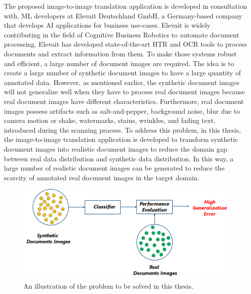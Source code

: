 The proposed image-to-image translation application is developed in consultation with, \ac{ML} developers at Elevait Deutschland GmbH, a Germany-based company that develops \ac{AI} applications for business use-cases. Elevait is widely contributing in the field of Cognitive Business Robotics\cite{Metta2012} to automate document processing. Elevait has developed state-of-the-art \ac{HTR} and \ac{OCR} tools to process documents and extract information from them. To make those systems robust and efficient, a large number of document images are required. The idea is to create a large number of synthetic document images to have a large quantity of annotated data. However, as mentioned earlier, the synthetic document images will not generalize well when they have to process real document images because real document images have different characteristics. Furthermore, real document images possess artifacts such as salt-and-pepper, background noise, blur due to camera motion or shake, watermarks, stains, wrinkles, and fading text, introduced during the scanning process\cite{sharma2019learning}. To address this problem, in this thesis, the image-to-image translation application is developed to transform synthetic document images into realistic document images to reduce the domain gap between real data distribution and synthetic data distribution. In this way, a large number of realistic document images can be generated to reduce the scarcity of annotated real document images in the target domain.




\begin{figure}[H]
        \begin{center}
	    \includegraphics[scale=0.60]{images/Introduction/Problem.png}
	    \caption[An illustration of the problem to be solved in this thesis.]{An illustration of the problem to be solved in this thesis.}
	    \label{fig:Problem}
	    \end{center}
\end{figure}



